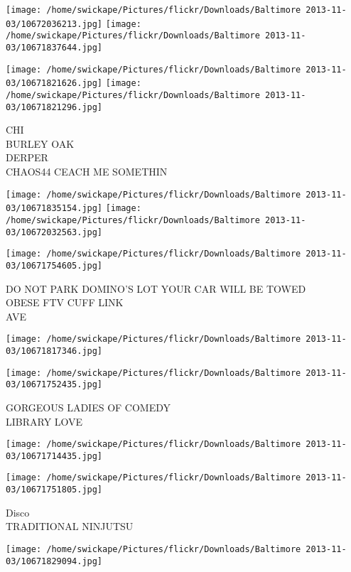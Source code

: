 \documentclass[10pt,letterpaper]{article}
\begin{document}
\texttt{[image: /home/swickape/Pictures/flickr/Downloads/Baltimore 2013-11-03/10672036213.jpg]}
\texttt{[image: /home/swickape/Pictures/flickr/Downloads/Baltimore 2013-11-03/10671837644.jpg]}

\texttt{[image: /home/swickape/Pictures/flickr/Downloads/Baltimore 2013-11-03/10671821626.jpg]}
\texttt{[image: /home/swickape/Pictures/flickr/Downloads/Baltimore 2013-11-03/10671821296.jpg]}

CHI\\
BURLEY OAK\\
DERPER\\
CHAOS44 CEACH ME SOMETHIN\\
\pagebreak

\texttt{[image: /home/swickape/Pictures/flickr/Downloads/Baltimore 2013-11-03/10671835154.jpg]}
\texttt{[image: /home/swickape/Pictures/flickr/Downloads/Baltimore 2013-11-03/10672032563.jpg]}

\texttt{[image: /home/swickape/Pictures/flickr/Downloads/Baltimore 2013-11-03/10671754605.jpg]}

DO NOT PARK DOMINO'S LOT YOUR CAR WILL BE TOWED\\
OBESE FTV CUFF LINK\\
AVE\\
\pagebreak

\texttt{[image: /home/swickape/Pictures/flickr/Downloads/Baltimore 2013-11-03/10671817346.jpg]}

\vspace{0.25in}
\texttt{[image: /home/swickape/Pictures/flickr/Downloads/Baltimore 2013-11-03/10671752435.jpg]}

GORGEOUS LADIES OF COMEDY\\
LIBRARY LOVE\\
\pagebreak

\texttt{[image: /home/swickape/Pictures/flickr/Downloads/Baltimore 2013-11-03/10671714435.jpg]}

\vspace{0.25in}
\texttt{[image: /home/swickape/Pictures/flickr/Downloads/Baltimore 2013-11-03/10671751805.jpg]}

Disco\\
TRADITIONAL NINJUTSU\\
\pagebreak

\texttt{[image: /home/swickape/Pictures/flickr/Downloads/Baltimore 2013-11-03/10671829094.jpg]}
\end{document}
